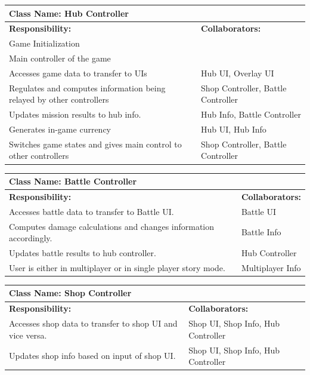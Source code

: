 \documentclass[]{article}
\begin{document}
\begin{table}[H]
	\centering
	\begin{tabular}{|p{8cm}|p{5cm}|}
	\hline 
	 \multicolumn{2}{|l|}{\textbf{Class Name:} Hub Controller} \\
	\hline
	\textbf{Responsibility:} & \textbf{Collaborators:} \\
	\hline
	Game Initialization & \\
	\hline
	Main controller of the game & \\
	\hline 
	Accesses game data to transfer to UIs &  Hub UI, Overlay UI\\
	\hline
    Regulates and computes information being relayed by other controllers & Shop Controller, Battle Controller\\
    \hline
    Updates mission results to hub info. & Hub Info, Battle Controller\\
    \hline
    Generates in-game currency & Hub UI, Hub Info\\
    \hline
    Switches game states and gives main control to other controllers & Shop Controller, Battle Controller\\
    \hline
	\end{tabular}
\end{table}


\begin{table}[H]
	\centering
	\begin{tabular}{|p{8cm}|p{5cm}|}
	\hline 
	 \multicolumn{2}{|l|}{\textbf{Class Name:} Battle Controller} \\
	\hline
	\textbf{Responsibility:} & \textbf{Collaborators:} \\
	\hline
    Accesses battle data to transfer to Battle UI. & Battle UI\\
    \hline 
    Computes damage calculations and changes information accordingly. & Battle Info\\
    \hline
    Updates battle results to hub controller. & Hub Controller\\
    \hline
    User is either in multiplayer or in single player story mode. & Multiplayer Info\\
    \hline
	\end{tabular}
\end{table}

\begin{table}[H]
	\centering
	\begin{tabular}{|p{8cm}|p{5cm}|}
	\hline 
	 \multicolumn{2}{|l|}{\textbf{Class Name: }Shop Controller}\\
	\hline
	\textbf{Responsibility:} & \textbf{Collaborators:} \\
	\hline
    Accesses shop data to transfer to shop UI and vice versa. & Shop UI, Shop Info, Hub Controller\\
    \hline
    Updates shop info based on input of shop UI. & Shop UI, Shop Info, Hub Controller\\
    \hline
	\end{tabular}
\end{table}
\end{document}
